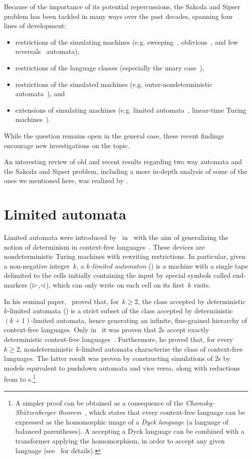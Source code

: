 Because of the importance of its potential repercussions, the Sakoda and Sipser problem has been tackled in many ways over the past decades, spanning four lines of development:
\begin{itemize}
	\item restrictions of the simulating machines (e.g. sweeping~\cite{Sip80}, oblivious~\cite{HroSch03}, and few reversals~\cite{Kap13} automata),
	\item restrictions of the language classes (especially the unary case~\cite{GefMer+07}),
	\item restrictions of the simulated machines (e.g. outer-nondeterministic automata~\cite{GefGui+14,KapPig15}), and
	\item extensions of simulating machines (e.g. limited automata~\cite{PigPis14,PigPri19,GuiPri19,PigPri+22}, linear-time Turing machines~\cite{Pru14,GuiPig+18,Hen65,GuiPig+23,Har68}).
\end{itemize}
While the question remains open in the general case, these recent findings encourage new investigations on the topic.

An interesting review of old and recent results regarding two way automata and the Sakoda and Sipser problem, including a more in-depth analysis of some of the ones we mentioned here, was realized by .


\section{Limited automata}
Limited automata were introduced by~ in~\citeyear{Hib67} with the aim of generalizing the notion of determinism in context-free languages~\cite{Hib67}.
These devices are nondeterministic Turing machines with rewriting restrictions.
In particular, given a non-negative integer~$k$, a \emph{$k$-limited automaton} (\kLA) is a machine with a single tape delimited to the cells initially containing the input by special symbols called end-markers ($\rhd$,$\lhd$), which can only write on each cell on its first~$k$ visits.

In his seminal paper,~\citeauthor{Hib67} proved that, for~$k\ge2$, the class accepted by deterministic $k$-limited automata (\kDLAs) is a strict subset of the class accepted by deterministic~$(k+1)$-limited automata, hence generating an infinite, fine-grained hierarchy of context-free languages.
Only in~\citeyear{PigPis15} it was proven that \DLA2s accept exactly deterministic context-free languages~\cite{PigPis15}.
Furthermore, he proved that, for every~$k\ge2$, nondeterministic $k$-limited automata characterize the class of context-free languages.
The latter result was proven by constructing simulations of \LA2s by models equivalent to pushdown automata and vice versa, along with reductions from \kLAs to s.\footnote{%
	A simpler proof can be obtained as a consequence of the \emph{Chomsky-Shützenberger theorem}~\cite{ChoSch63}, which states that every context-free language can be expressed as the homomorphic image of a \emph{Dyck language} (a language of balanced parentheses).
	A  accepting a Dyck language can be combined with a transformer applying the homomorphism, in order to accept any given language (see~\cite{Pig19} for details).}


